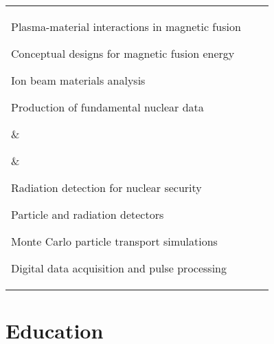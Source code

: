 \documentclass[10pt]{article}
\begin{document}
\begin{tabular}[t]{@{}p{\textwidth-\rcollength-\spacewidth}@{}p{\spacewidth}@{}p{\rcollength}}%

\parbox{\textwidth-\rcollength-\spacewidth}{%
\begin{innerlist}
\item Plasma-material interactions in magnetic fusion
\item Conceptual designs for magnetic fusion energy
\item Ion beam materials analysis
\item Production of fundamental nuclear data
\end{innerlist}
}
& \parbox{\spacewidth}{\centering} &

\parbox{\rcollength}{%

\begin{innerlist}
\item Radiation detection for nuclear security
\item Particle and radiation detectors
\item Monte Carlo particle transport simulations
\item Digital data acquisition and pulse processing
\end{innerlist}
}
\end{tabular}

\vspace{0.4cm}

\section{Education}
\end{document}
